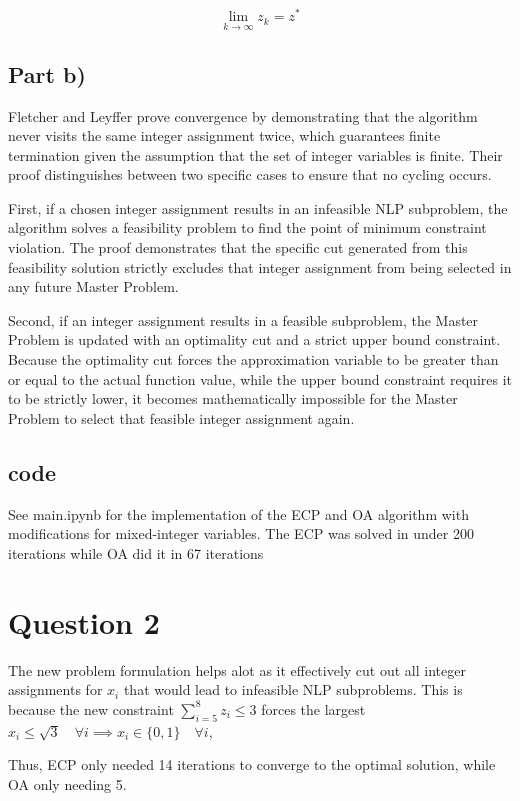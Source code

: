 \documentclass{article} %
\begin{document}
    $$\lim_{k \to \infty} z_k = z^*$$
    
    \subsection*{Part b)}
    Fletcher and Leyffer prove convergence by demonstrating that the algorithm never visits the same integer assignment twice, which guarantees finite termination given the assumption that the set of integer variables is finite. 
    Their proof distinguishes between two specific cases to ensure that no cycling occurs.

    First, if a chosen integer assignment results in an infeasible NLP subproblem, the algorithm solves a feasibility problem to find the point of minimum constraint violation. 
    The proof demonstrates that the specific cut generated from this feasibility solution strictly excludes that integer assignment from being selected in any future Master Problem.

    Second, if an integer assignment results in a feasible subproblem, the Master Problem is updated with an optimality cut and a strict upper bound constraint. 
    Because the optimality cut forces the approximation variable to be greater than or equal to the actual function value, while the upper bound constraint requires it to be strictly lower, it becomes mathematically impossible for the Master Problem to select that feasible integer assignment again.
    
    \subsection*{code}
    See main.ipynb for the implementation of the ECP and OA algorithm with modifications for mixed-integer variables.
    The ECP was solved in under 200 iterations while OA did it in 67 iterations


\section*{Question 2}
    The new problem formulation helps alot as it effectively cut out all integer assignments for $x_i$ that would lead to infeasible NLP subproblems.
    This is because the new constraint $\sum_{i=5}^{8} z_i \leq 3$ forces the largest $x_i \leq \sqrt{3} \quad \forall i \implies x_i \in \{0,1\} \quad \forall i$, 

    Thus, ECP only needed 14 iterations to converge to the optimal solution, while OA only needing 5.
\end{document}
